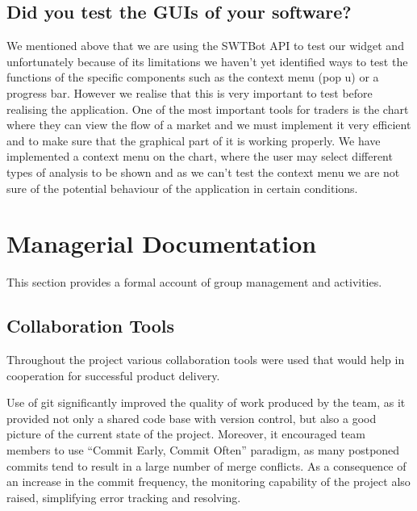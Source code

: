 \documentclass[10pt]{article}
\begin{document}
\subsection{Did you test the GUIs of your software?}


We mentioned above that we are using the SWTBot API to test our widget and unfortunately because of its limitations we haven’t yet identified ways to test the functions of the specific components such as the context menu (pop u) or a progress bar. However we realise that this is very important to test before realising the application. One of the most important tools for traders is the chart where they can view the flow of a market and we must implement it very efficient and to make sure that the graphical part of it is working properly. We have implemented a context menu on the chart, where the user may select different types of analysis to be shown and as we can’t test the context menu we are not sure of the potential behaviour of the application in certain conditions.


\section{Managerial Documentation}
\label{sec-group}

This section provides a formal account of group management and activities.

\subsection{Collaboration Tools}

Throughout the project various collaboration tools were used that would help in cooperation for successful product delivery.

Use of git significantly improved the quality of work produced by the team, as it provided not only a shared code base with version control, but also a good picture of the current state of the project. Moreover, it encouraged team members to use ``Commit Early, Commit Often'' paradigm, as many postponed commits tend to result in a large number of merge conflicts. As a consequence of an increase in the commit frequency, the monitoring capability of the project also raised, simplifying error tracking and resolving.
\end{document}
